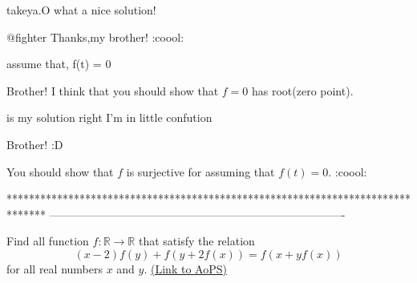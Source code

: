 \begin{solution}
	takeya.O what a nice solution!
\end{solution}



\begin{solution}
	@fighter
Thanks,my brother! :coool:
\end{solution}



\begin{solution}
	\begin{tcolorbox}assume that, f(t) = 0\end{tcolorbox}

Brother!
I think that you should show that $f=0$ has root(zero point). 

\end{solution}



\begin{solution}
	is my solution right I'm in little confution
\end{solution}



\begin{solution}
	Brother! :D

You should show that $f$ is surjective for assuming that $f(t)=0$. :coool:
\end{solution}
*******************************************************************************
-------------------------------------------------------------------------------

\begin{problem}
	Find all function $f:\mathbb{R}\to\mathbb{R}$ that satisfy the relation
\[(x-2)f(y)+f(y+2f(x))=f(x+yf(x))\]
for all real numbers $x$ and $y$.
	\flushright \href{https://artofproblemsolving.com/community/c6h414538}{(Link to AoPS)}
\end{problem}



